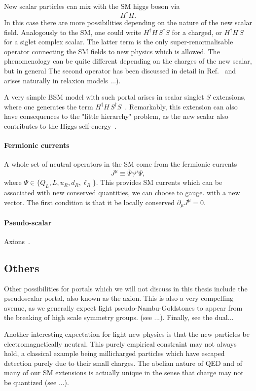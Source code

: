 New scalar particles can mix with the SM higgs boson via 
\begin{equation}
 H^\dagger H.
\end{equation}
In this case there are more possibilities depending on the nature of the new scalar field. Analogously to the SM, one could write  $H^\dagger H \, S^\dagger S$ for a charged, or $H^\dagger H\, S $ for a siglet complex scalar. The latter term is the only super-renormalisable operator connecting the SM fields to new physics which is allowed.  The phenomenology can be quite different depending on the charges of the new scalar, but in general The second operator has been discussed in detail in Ref.~\cite{Fradette:2018hhl} and arises naturally in relaxion models ...).

A very simple BSM model with such portal arises in scalar singlet $S$ extensions, where one generates the term $H^\dagger H \, S^\dagger S$~\cite{Silveira:1985rk}. Remarkably, this extension can also have consequences to the "little hierarchy" problem, as the new scalar also contributes to the Higgs self-energy~\cite{Craig:2013xia}.


\paragraph{Fermionic currents}

A whole set of neutral operators in the SM come from the fermionic currents
\begin{equation}
 J^\mu \equiv \overline{\Psi} \gamma^\mu \Psi,
\end{equation}
where $\Psi \in \{Q_L, L, u_R, d_R, \ell_R\}$. This provides SM currents which can be associated with new conserved quantities, \eg we can choose to gauge. with a new vector. The first condition is that it be locally conserved $\partial_\mu J^\mu = 0$. 

\paragraph{Pseudo-scalar} Axions~\cite{Weinberg:1977ma}.

\subsection{Others}

Other possibilities for portals which we will not discuss in this thesis include the pseudoscalar portal, also known as the axion. This is also a very compelling avenue, as we generally expect light pseudo-Nambu-Goldstones to appear from the breaking of high scale symmetry groups. (see ...). Finally, see the dual...

Another interesting expectation for light new physics is that the new particles be electromagnetically neutral. This purely empirical constraint may not always hold, a classical example being millicharged particles which have escaped detection purely due to their small charges. The abelian nature of QED and of many of our SM extensions is actually unique in the sense that charge may not be quantized (see \eg ...).